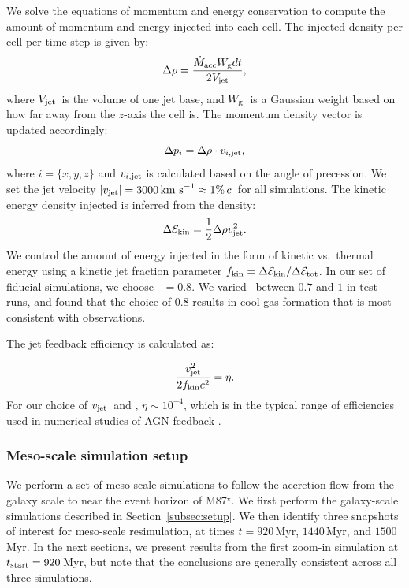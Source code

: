 We solve the equations of momentum and energy conservation to compute the amount of momentum and energy injected into each cell. The injected density per cell per time step is given by:
\begin{equation}
\label{eq:drho}
    \Delta \rho = \frac{\dot{M}_{\rm acc} W_{\rm g} dt}{2V_{\rm jet}},
\end{equation}
where $V_{\rm jet}$\ is the volume of one jet base, and $W_{\rm g}$\ is a Gaussian weight based on how far away from the $z$-axis the cell is. The momentum density vector is updated accordingly:
\begin{equation}
\label{eq:jet-momentum}
    \Delta p_i = \Delta \rho \cdot v_{i, \rm jet},
\end{equation}
where $i = \{x,y,z\}$ and $v_{i,\rm jet}$ is calculated based on the angle of precession. We set the jet velocity $|v_{\rm jet}| = 3000\,\mathrm{km~s}^{-1} \approx 1\%\,c$\ for all simulations.
The kinetic energy density injected is inferred from the density:
\begin{equation}
\label{eq:jet-KE}
    \Delta \mathcal{E}_{\rm kin} = \frac{1}{2} \Delta \rho v_{\rm jet}^2.
\end{equation}
We control the amount of energy injected in the form of kinetic vs.\ thermal energy using a kinetic jet fraction parameter $f_{\rm kin} = \Delta \mathcal{E}_{\rm kin} / \Delta \mathcal{E}_{\rm tot}$. In our set of fiducial simulations, we choose \fkin\ $=0.8$. We varied \fkin\ between $0.7$ and $1$ in test runs, and found that the choice of $0.8$ results in cool gas formation that is most consistent with observations.

The jet feedback efficiency is calculated as:

\begin{equation} \label{eq:jet_eff}
    \frac{v_{\rm jet}^2}{2f_{\rm kin} c^2} = \eta.
\end{equation}
For our choice of $v_{\rm jet}$\ and \fkin, $\eta \sim 10^{-4}$, which is in the typical range of efficiencies used in numerical studies of AGN feedback \citep[e.g.,][]{li_2014a, li_2014b, prasad_cool_2015, yang_how_2016}.


\subsubsection{Meso-scale simulation setup} 

We perform a set of meso-scale simulations to follow the accretion flow from the galaxy scale to near the event horizon of M87$^{\star}$. We first perform the galaxy-scale simulations described in Section~\ref{subsec:setup}.
We then identify three snapshots of interest for meso-scale resimulation, at times $t = 920\,$Myr, $1440\,$Myr, and $1500$\,Myr.
In the next sections, we present results from the first zoom-in simulation at $t_{\rm start} = 920$\,Myr, but note that the conclusions are generally consistent across all three simulations.


